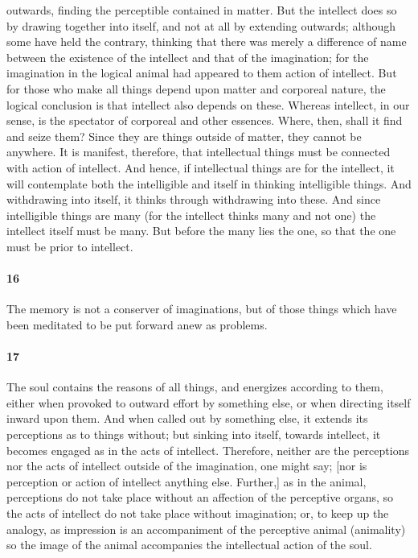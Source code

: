 \documentclass[12pt]{article}
\begin{document}
outwards, finding the perceptible contained in matter. But the intellect does
so by drawing together into itself, and not at all by extending outwards;
although some have held the contrary, thinking that there was merely a
difference of name between the existence of the intellect and that of the
imagination; for the imagination in the logical animal had appeared to them
action of intellect. But for those who make all things depend upon matter and
corporeal nature, the logical conclusion is that intellect also depends on
these. Whereas intellect, in our sense, is the spectator of corporeal and other
es\-sences. Where, then, shall it find and seize them? Since they are things
outside of matter, they cannot be anywhere. It is manifest, therefore, that
intellectual things must be connected with action of intellect. And hence, if
intellectual things are for the intellect, it will contemplate both the
intelligible and itself in thinking intelligible things. And withdrawing into
itself, it thinks through withdrawing into these. And since intelligible things
are many (for the intellect thinks many and not one) the intellect itself must
be many. But before the many lies the one, so that the one must be prior to
intellect.

\paragraph{16} The memory is not a conserver of imaginations, but of those
things which have been meditated to be put forward anew as problems.

\paragraph{17} The soul contains the reasons of all things, and energizes
according to them, either when provoked to outward effort by something else, or
when directing itself inward upon them. And when called out by something else,
it extends its perceptions as to things without; but sinking into itself,
towards intellect, it becomes engaged as in the acts of intellect. Therefore,
neither are the perceptions nor the acts of intellect outside of the
imagination, one might say; [nor is perception or action of intellect anything
else. Further,] as in the animal, perceptions do not take place without an
affection of the perceptive organs, so the acts of intellect do not take place
without imagination; or, to keep up the analogy, as impression is an
accompaniment of the perceptive animal (animality) so the image of the animal
accompanies the intellectual action of the soul.
\end{document}
